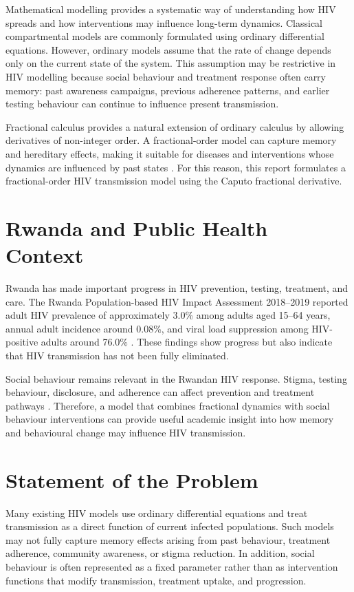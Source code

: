 \documentclass[12pt,a4paper,oneside]{report}
\begin{document}
Mathematical modelling provides a systematic way of understanding how HIV spreads and how interventions may influence long-term dynamics. Classical compartmental models are commonly formulated using ordinary differential equations. However, ordinary models assume that the rate of change depends only on the current state of the system. This assumption may be restrictive in HIV modelling because social behaviour and treatment response often carry memory: past awareness campaigns, previous adherence patterns, and earlier testing behaviour can continue to influence present transmission.

Fractional calculus provides a natural extension of ordinary calculus by allowing derivatives of non-integer order. A fractional-order model can capture memory and hereditary effects, making it suitable for diseases and interventions whose dynamics are influenced by past states \citep{Podlubny1999,Kilbas2006,Diethelm2010}. For this reason, this report formulates a fractional-order HIV transmission model using the Caputo fractional derivative.

\newpage

\section{Rwanda and Public Health Context}
Rwanda has made important progress in HIV prevention, testing, treatment, and care. The Rwanda Population-based HIV Impact Assessment 2018--2019 reported adult HIV prevalence of approximately 3.0\% among adults aged 15--64 years, annual adult incidence around 0.08\%, and viral load suppression among HIV-positive adults around 76.0\% \citep{RBC2020RPHIA}. These findings show progress but also indicate that HIV transmission has not been fully eliminated.

Social behaviour remains relevant in the Rwandan HIV response. Stigma, testing behaviour, disclosure, and adherence can affect prevention and treatment pathways \citep{RRP2020Stigma}. Therefore, a model that combines fractional dynamics with social behaviour interventions can provide useful academic insight into how memory and behavioural change may influence HIV transmission.

\section{Statement of the Problem}
Many existing HIV models use ordinary differential equations and treat transmission as a direct function of current infected populations. Such models may not fully capture memory effects arising from past behaviour, treatment adherence, community awareness, or stigma reduction. In addition, social behaviour is often represented as a fixed parameter rather than as intervention functions that modify transmission, treatment uptake, and progression.
\end{document}

